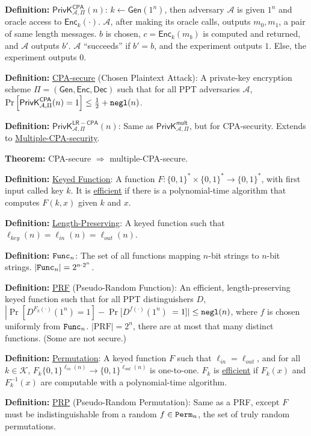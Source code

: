 \documentclass[10pt]{article}
\newcommand{\AAA}{\mathcal{A}}
\newcommand{\KKK}{\mathcal{K}}
\newcommand{\defn}[1]{{\bf Definition:} \underline{#1}}
\newcommand{\thm}[1]{{\bf Theorem:} \underline{#1}}
\newcommand{\Enc}{\mathsf{Enc}}
\newcommand{\Dec}{\mathsf{Dec}}
\newcommand{\Gen}{\mathsf{Gen}}
\newcommand{\GenEncDec}{(\Gen,\Enc,\Dec)}
\newcommand{\ExptMultArgs}[2]{\mathsf{PrivK}^{\mathsf{mult}}_{#1,#2}}
\newcommand{\ExptCpaArgs}[2]{\mathsf{PrivK}^{\mathsf{CPA}}_{#1,#2}}
\newcommand{\ExptLrCpa}{\mathsf{PrivK}^{\mathsf{LR-CPA}}_{\AAA,\Pi}}
\newcommand{\ExptMult}{\ExptMultArgs{\AAA}{\Pi}}
\newcommand{\ExptCpa}{\ExptCpaArgs{\AAA}{\Pi}}
\newcommand{\negl}{{\tt negl}}
\newcommand{\from}{\leftarrow}
\begin{document}
\begin{multicols}{4}

\defn{$\ExptCpa(n)$}: $k\from\Gen(1^n)$, then adversary $\AAA$ is given $1^n$ and oracle access to $\Enc_k(\cdot)$. $\AAA$, after making its oracle calls, outputs $m_0,m_1$, a pair of same length messages. $b$ is chosen, $c=\Enc_k(m_b)$ is computed and returned, and $\AAA$ outputs $b'$. $\AAA$ ``succeeds'' if $b'=b$, and the experiment outputs $1$. Else, the experiment outputs $0$.

\defn{CPA-secure} (Chosen Plaintext Attack): A private-key encryption scheme $\Pi=\GenEncDec$ such that for all PPT adversaries $\AAA$, $\Pr\left[\ExptCpa(n)=1\right]\leq\frac{1}{2}+\negl(n)$.

\defn{$\ExptLrCpa(n)$}: Same as $\ExptMult$, but for CPA-security. Extends to \underline{Multiple-CPA-security}.

\thm{}CPA-secure $\Rightarrow$ multiple-CPA-secure.

\defn{Keyed Function}: A function $F:\{0,1\}^*\times\{0,1\}^*\to\{0,1\}^*$, with first input called key $k$. It is \underline{efficient} if there is a polynomial-time algorithm that computes $F(k,x)$ given $k$ and $x$.

\defn{Length-Preserving}: A keyed function such that $\ell_{key}(n)=\ell_{in}(n)=\ell_{out}(n)$.

\defn{${\tt Func}_n$}: The set of all functions mapping $n$-bit strings to $n$-bit strings. $|{\tt Func}_n|=2^{n\cdot2^n}$.

\defn{PRF} (Pseudo-Random Function): An efficient, length-preserving keyed function such that for all PPT distinguishers $D$, $\left|\Pr[D^{F_k(\cdot)}(1^n)=1]-\Pr[D^{f(\cdot)}(1^n)\right.$ $\left.=1]\right|\leq\negl(n)$, where $f$ is chosen uniformly from ${\tt Func}_n$. $|\text{PRF}|=2^n$, there are at most that many distinct functions. (Some are not secure.)

\defn{Permutation}: A keyed function $F$ such that $\ell_{in}=\ell_{out}$, and for all $k\in\KKK$, $F_k\{0,1\}^{\ell_{in}(n)}\to\{0,1\}^{\ell_{out}(n)}$ is one-to-one. $F_k$ is \underline{efficient} if $F_k(x)$ and $F_k^{-1}(x)$ are computable with a polynomial-time algorithm.

\defn{PRP} (Pseudo-Random Permutation): Same as a PRF, except $F$ must be indistinguishable from a random $f\in{\tt Perm}_n$, the set of truly random permutations.


\end{multicols}
\end{document}
